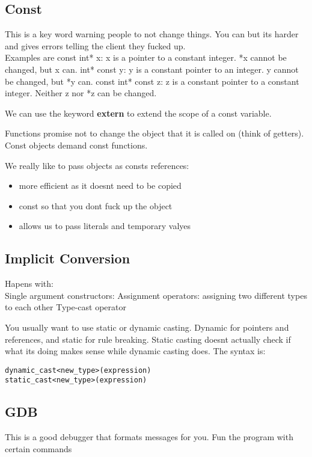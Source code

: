 \documentclass[12pt]{article}
\begin{document}
\subsection*{Const}
This is a key word warning people to not change things. You can but its harder and gives errors telling the client they fucked up.  \\
Examples are 
const int* x: x is a pointer to a constant integer. *x cannot be changed, but x can.
int* const y: y is a constant pointer to an integer. y cannot be changed, but *y can.
const int* const z: z is a constant pointer to a constant integer. Neither z nor *z can be
changed.

We can use the keyword \textbf{extern} to extend the scope of a const variable.

Functions promise not to change the object that it is called on (think of getters). Const objects demand const functions.

We really like to pass objects as consts references:
\begin{itemize}
\item more efficient as it doesnt need to be copied 
\item const so that you dont fuck up the object
\item allows us to pass literals and temporary valyes
\end{itemize}

\subsection*{Implicit Conversion}
Hapens with: \\
Single argument constructors: 
Assignment operators: assigning two different types to each other
Type-cast operator

You usually want to use static or dynamic casting. Dynamic for pointers and references, and static for rule breaking. Static casting doesnt actually check if what its doing makes sense while dynamic casting does. The syntax is:
\begin{verbatim}
dynamic_cast<new_type>(expression)
static_cast<new_type>(expression)
\end{verbatim}

\subsection{GDB}
This is a good debugger that formats messages for you. Fun the program with certain commands
\end{document}
